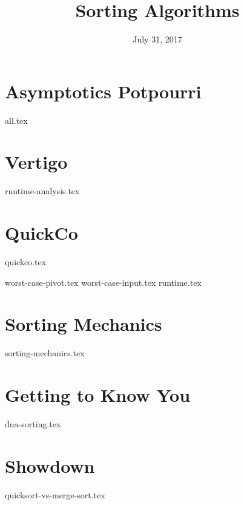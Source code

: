 \documentclass{exam}
\title{Sorting Algorithms}
\date{July 31, 2017}
\begin{document}
\maketitle

\section{Asymptotics Potpourri}
{all.tex}

\section{Vertigo}
\begin{questions}
{runtime-analysis.tex}
\end{questions}

\clearpage

\section{QuickCo}
{quickco.tex}
\begin{questions}
{worst-case-pivot.tex}
{worst-case-input.tex}
{runtime.tex}
\end{questions}

\clearpage

\section{Sorting Mechanics}
\begin{questions}
{sorting-mechanics.tex}
\end{questions}

\clearpage

\section{Getting to Know You}
\begin{questions}
{dna-sorting.tex}
\end{questions}

\section{Showdown}
\begin{questions}
{quicksort-vs-merge-sort.tex}
\end{questions}
\end{document}

